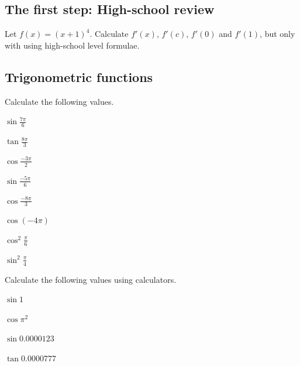 \documentclass[11pt,pdfa,lastpage]{MishoNote}
\begin{document}
\subsection{The first step: High-school review}
\begin{enumerate}[start=14]
  \itemB Let $f(x)=(x+1)^4$. Calculate $f'(x)$, $f'(c)$, $f'(0)$ and $f'(1)$, but only with using high-school level formulae.
\end{enumerate}

\subsection{Trigonometric functions}

\begin{enumerate}[resume]
  \itemA Calculate the following values.
  \begin{menumerate}{4}
    \item $\displaystyle\sin\frac{7\pi}6$
    \item $\displaystyle\tan\frac{8\pi}3$
    \item $\displaystyle\cos\frac{-3\pi}2$
    \item $\displaystyle\sin\frac{-5\pi}6$
    \item $\displaystyle\cos\frac{-8\pi}3$
    \item $\cos(-4\pi)$
    \item $\displaystyle\cos^2\frac\pi6$
    \item $\displaystyle\sin^2\frac\pi4$
  \end{menumerate}
  \itemA Calculate the following values using calculators.
  \begin{menumerate}{4}
    \item $\sin1$
    \item $\cos\pi^2$
    \item $\sin0.0000123$
    \item $\tan0.0000777$
   \end{menumerate}
\end{enumerate}
\end{document}
